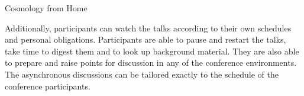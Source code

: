 \documentclass[../SustainableHEP.tex]{subfiles}
\begin{document}
\begin{casestudy}{Cosmology from Home}

Additionally, participants can watch the talks according to their own schedules and personal obligations. Participants are able to pause and restart the talks, take time to digest them and to look up background material. They are also able to prepare and raise points for discussion in any of the conference environments. The asynchronous discussions can be tailored exactly to the schedule of the conference participants.











\end{casestudy}
\end{document}
